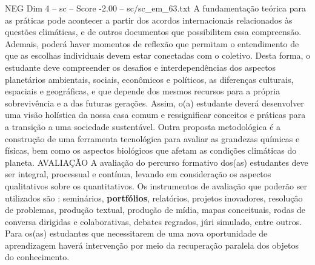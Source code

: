 \begin{textsample}{NEG Dim 4 – sc – Score -2.00 – sc/sc\_em\_63.txt}
A fundamentação teórica para as práticas pode acontecer a partir dos acordos internacionais relacionados às questões climáticas, e de outros documentos que possibilitem essa compreensão.
Ademais, poderá haver momentos de reflexão que permitam o entendimento de que as escolhas individuais devem estar conectadas com o coletivo.
Desta forma, o estudante deve compreender os desafios e interdependências dos aspectos planetários ambientais, sociais, econômicos e políticos, as diferenças culturais, espaciais e geográficas, e que depende dos mesmos recursos para a própria sobrevivência e a das futuras gerações.
Assim, o(a) estudante deverá desenvolver uma visão holística da nossa casa comum e ressignificar conceitos e práticas para a transição a uma sociedade sustentável.
Outra proposta metodológica é a construção de uma ferramenta tecnológica para avaliar as grandezas químicas e físicas, bem como os aspectos biológicos que afetam as condições climáticas do planeta.
AVALIAÇÃO A avaliação do percurso formativo dos(as) estudantes deve ser integral, processual e contínua, levando em consideração os aspectos qualitativos sobre os quantitativos.
Os instrumentos de avaliação que poderão ser utilizados são : seminários, \textbf{portfólios}, relatórios, projetos inovadores, resolução de problemas, produção textual, produção de mídia, mapas conceituais, rodas de conversa dirigidas e colaborativas, debates regrados, júri simulado, entre outros.
Para os(as) estudantes que necessitarem de uma nova oportunidade de aprendizagem haverá intervenção por meio da recuperação paralela dos objetos do conhecimento.

\end{textsample}
